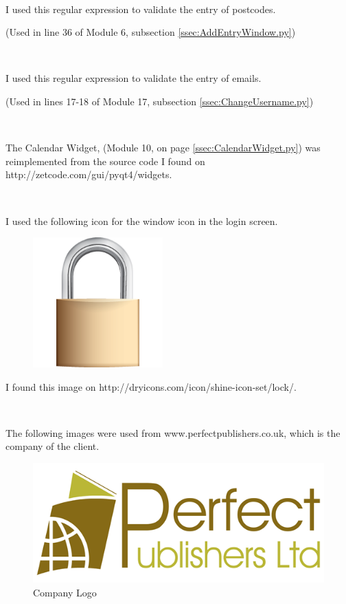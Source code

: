 \

I used this regular expression to validate the entry of postcodes.

\begin{tiny}
\end{tiny}
(Used in line 36 of Module 6, subsection \ref{ssec:AddEntryWindow.py})

\

I used this regular expression to validate the entry of emails.

\begin{tiny}
\end{tiny}
(Used in lines 17-18 of Module 17, subsection \ref{ssec:ChangeUsername.py})

\

The Calendar Widget, (Module 10, on page \ref{ssec:CalendarWidget.py}) was reimplemented from the source code I found on http://zetcode.com/gui/pyqt4/widgets.
\begin{tiny}
\end{tiny}

\

I used the following icon for the window icon in the login screen.

\begin{figure}[H]
    \includegraphics[width=5cm]{./Implementation/Database/LoginIcon.png}
\end{figure}

I found this image on http://dryicons.com/icon/shine-icon-set/lock/.

\

The following images were used from www.perfectpublishers.co.uk, which is the company of the client.

\begin{figure}[H]
    \includegraphics[width=\textwidth]{./Implementation/Database/PerfectPublishersLtd.png}
    \caption{Company Logo}
\end{figure}

